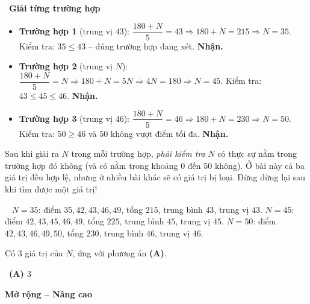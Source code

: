 \documentclass[11pt]{article}
\providecommand{\AnsWord}{Đáp số}
\newcommand{\ans}[1]{\par\smallskip{\bfseries\color{tmGreen!88!black}\AnsWord:}\ {\bfseries\color{AnsRed}#1}\par}
\newcommand{\dividerbar}[1]{\par\vspace{0.6em}\noindent
  \begin{tcolorbox}[enhanced,frame hidden,interior hidden,borderline west={5pt}{0pt}{ProbBlue},
    colback=white,left=12pt,right=12pt,top=5pt,bottom=5pt,arc=4pt]
  {\large\bfseries\color{ProbBlue} #1}\end{tcolorbox}\vspace{0.4em}}
\newcommand{\step}[2]{\par\smallskip\noindent{\bfseries\color{tmBlue!85!black}\StepWord~#1.}\ {\bfseries #2}\par\nopagebreak}
\newcommand{\verify}[1]{\par\smallskip\noindent{\bfseries\color{tmGreen!80!black}\faCheckCircle\ \CheckWord}\ #1\par}
\def\AnsWord{Đáp số}
\def\StepWord{Bước}
\def\CheckWord{Thử lại:}
\begin{document}
{\step{3}{Giải từng trường hợp}
\begin{itemize}[leftmargin=1.4em,itemsep=1pt]
\item \textbf{Trường hợp 1} (trung vị $43$): $\dfrac{180+N}{5}=43\Rightarrow 180+N=215\Rightarrow N=35$. Kiểm tra: $35\le 43$ -- đúng trường hợp đang xét. \textbf{Nhận.}
\item \textbf{Trường hợp 2} (trung vị $N$): $\dfrac{180+N}{5}=N\Rightarrow 180+N=5N\Rightarrow 4N=180\Rightarrow N=45$. Kiểm tra: $43\le 45\le 46$. \textbf{Nhận.}
\item \textbf{Trường hợp 3} (trung vị $46$): $\dfrac{180+N}{5}=46\Rightarrow 180+N=230\Rightarrow N=50$. Kiểm tra: $50\ge 46$ và $50$ không vượt điểm tối đa. \textbf{Nhận.}
\end{itemize}

\begin{warnbox}Sau khi giải ra $N$ trong mỗi trường hợp, \emph{phải kiểm tra} $N$ có thực sự nằm trong trường hợp đó không (và có nằm trong khoảng $0$ đến $50$ không). Ở bài này cả ba giá trị đều hợp lệ, nhưng ở nhiều bài khác sẽ có giá trị bị loại. Đừng dừng lại sau khi tìm được một giá trị!\end{warnbox}

\verify{
$N=35$: điểm $35,42,43,46,49$, tổng $215$, trung bình $43$, trung vị $43$.
$N=45$: điểm $42,43,45,46,49$, tổng $225$, trung bình $45$, trung vị $45$.
$N=50$: điểm $42,43,46,49,50$, tổng $230$, trung bình $46$, trung vị $46$.}
Có $3$ giá trị của $N$, ứng với phương án \textbf{(A)}.
\ans{(A) $3$}
}

\clearpage
\dividerbar{Mở rộng -- Nâng cao}

\end{document}
